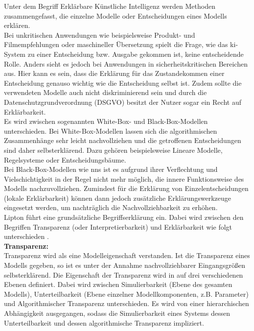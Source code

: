 \documentclass[twoside, 12pt,a4paper]{book}
\numberwithin{equation}{section}
\begin{document}
	Unter dem Begriff Erklärbare Künstliche Intelligenz werden Methoden zusammengefasst, die einzelne Modelle oder Entscheidungen eines Modells erklären.\\
	
	\noindent Bei unkritischen Anwendungen wie beispielsweise Produkt- und Filmempfehlungen oder maschineller Übersetzung spielt die Frage, wie das \ac{ki}-System zu einer Entscheidung bzw. Ausgabe gekommen ist, keine entscheidende Rolle. Anders sieht es jedoch bei Anwendungen in sicherheitskritischen Bereichen aus. Hier kann es sein, dass die Erklärung für das Zustandekommen einer Entscheidung genauso wichtig wie die Entscheidung selbst\cite{LRP_DNN} ist. Zudem sollte die verwendeten Modelle auch nicht diskriminierend sein und durch die Datenschutzgrundverordnung (DSGVO) besitzt der Nutzer sogar ein Recht auf Erklärbarkeit.\\
	
	\noindent Es wird zwischen sogenannten White-Box- und Black-Box-Modellen unterschieden. Bei White-Box-Modellen lassen sich die algorithmischen Zusammenhänge sehr leicht nachvollziehen und die getroffenen Entscheidungen sind daher selbsterklärend. Dazu gehören beispielsweise Lineare Modelle, Regelsysteme oder Entscheidungsbäume.\\
	
	\noindent Bei Black-Box-Modellen wie \acp{nn} ist es aufgrund ihrer Verflechtung und Vielschichtigkeit in der Regel nicht mehr möglich, die innere Funktionsweise des Modells nachzuvollziehen. Zumindest für die Erklärung von Einzelentscheidungen (lokale Erklärbarkeit) können dann jedoch zusätzliche Erklärungswerkzeuge eingesetzt werden, um nachträglich die Nachvollziehbarkeit zu erhöhen. \\
	
	\noindent Lipton \cite{lipton} führt eine grundsätzliche Begriffserklärung ein. Dabei wird zwischen den Begriffen Transparenz (oder Interpretierbarkeit) und Erklärbarkeit wie folgt unterschieden \cite{kistudie}.\\
	
	
	\noindent \textbf{Transparenz: }\\
	Transparenz wird als eine Modelleigenschaft verstanden. Ist die Transparenz eines Modells
	gegeben, so ist es unter der Annahme nachvollziehbarer Eingangsgrößen selbsterklärend. Die Eigenschaft der	Transparenz wird in \cite{lipton} auf drei verschiedenen Ebenen definiert. Dabei wird zwischen Simulierbarkeit (Ebene des gesamten Modells), Unterteilbarkeit (Ebene einzelner Modellkomponenten, z.B. Parameter) und Algorithmischer Transparenz unterschieden. Es wird von einer hierarchischen Abhängigkeit ausgegangen, sodass die Simulierbarkeit eines Systems dessen Unterteilbarkeit und dessen algorithmische Transparenz	impliziert. 
	
\end{document}

